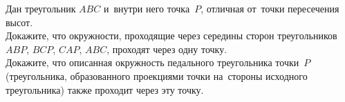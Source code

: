 \begin{problems}
\item
Дан треугольник $ABC$ и~внутри него точка~$P$, отличная от~точки пересечения
высот.
\\
\sp
Докажите, что окружности, проходящие через середины сторон треугольников
$ABP$, $BCP$, $CAP$, $ABC$, проходят через одну точку.
\\
\sp
Докажите, что описанная окружность педального треугольника точки~$P$
(треугольника, образованного проекциями точки на~стороны исходного
треугольника) также проходит через эту точку.

\end{problems}

